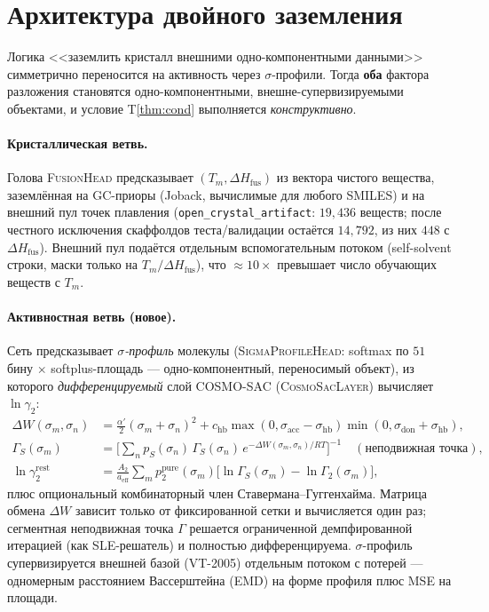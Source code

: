 \documentclass[11pt]{article}
\theoremstyle{plain}
\theoremstyle{definition}
\newcommand{\dHfus}{\Delta H_{\mathrm{fus}}}
\newcommand{\Tm}{T_m}
\newcommand{\lng}{\ln\gamma_2}
\begin{document}
\section{Архитектура двойного заземления}
\label{sec:arch}
Логика <<заземлить кристалл внешними одно-компонентными данными>> симметрично
переносится на активность через $\sigma$-профили. Тогда \textbf{оба} фактора
разложения становятся одно-компонентными, внешне-супервизируемыми объектами, и
условие T\ref{thm:cond} выполняется \emph{конструктивно}.

\paragraph{Кристаллическая ветвь.} Голова \textsc{FusionHead} предсказывает
$(\Tm,\dHfus)$ из вектора чистого вещества, заземлённая на GC-приоры (Joback,
вычислимые для любого SMILES) и на внешний пул точек плавления
(\texttt{open\_crystal\_artifact}: $19{,}436$ веществ; после честного исключения
скаффолдов теста/валидации остаётся $14{,}792$, из них $448$ с $\dHfus$). Внешний
пул подаётся отдельным вспомогательным потоком (self-solvent строки, маски только
на $\Tm/\dHfus$), что $\approx\!10\times$ превышает число обучающих веществ с
$\Tm$.

\paragraph{Активностная ветвь (новое).} Сеть предсказывает
\emph{$\sigma$-профиль} молекулы (\textsc{SigmaProfileHead}: softmax по $51$
бину $\times$ softplus-площадь --- одно-компонентный, переносимый объект),
из которого \emph{дифференцируемый} слой COSMO-SAC (\textsc{CosmoSacLayer})
вычисляет $\lng$:
\begin{align}
\Delta W(\sigma_m,\sigma_n) &= \tfrac{\alpha'}{2}(\sigma_m+\sigma_n)^2
   + c_{\text{hb}}\max(0,\sigma_{\text{acc}}-\sigma_{\text{hb}})
     \min(0,\sigma_{\text{don}}+\sigma_{\text{hb}}),\\
\Gamma_S(\sigma_m) &= \Big[\textstyle\sum_n p_S(\sigma_n)\,\Gamma_S(\sigma_n)\,
   e^{-\Delta W(\sigma_m,\sigma_n)/RT}\Big]^{-1}\quad(\text{неподвижная точка}),\\
\ln\gamma_2^{\text{rest}} &= \frac{A_2}{a_{\text{eff}}}\sum_m
   p_2^{\text{pure}}(\sigma_m)\big[\ln\Gamma_S(\sigma_m)-\ln\Gamma_2(\sigma_m)\big],
\end{align}
плюс опциональный комбинаторный член Ставермана--Гуггенхайма. Матрица обмена
$\Delta W$ зависит только от фиксированной сетки и вычисляется один раз; сегментная
неподвижная точка $\Gamma$ решается ограниченной демпфированной итерацией (как
SLE-решатель) и полностью дифференцируема. $\sigma$-профиль супервизируется внешней
базой (VT-2005) отдельным потоком с потерей --- одномерным расстоянием
Вассерштейна (EMD) на форме профиля плюс MSE на площади.
\end{document}
